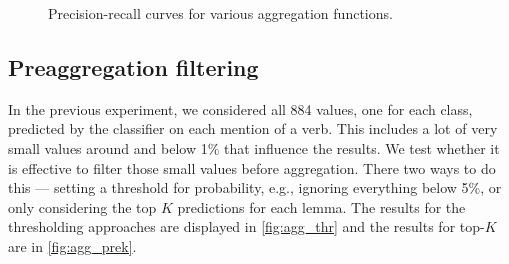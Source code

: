 \begin{figure}[h]
\centering

\begin{subfigure}[t]{0.5\textwidth}
\centering

\end{subfigure}%
%
\begin{subfigure}[t]{0.5\textwidth}
\centering

\end{subfigure}

\begin{subfigure}[t]{0.5\textwidth}
\centering

\end{subfigure}%
%
\begin{subfigure}[t]{0.5\textwidth}
\centering

\end{subfigure}

\caption{Precision-recall curves for various aggregation functions.}
\label{fig:agg_functions}
\end{figure}

\subsection{Preaggregation filtering}

In the previous experiment, we considered all 884 values, one for each class, predicted by the classifier on each mention of a verb. This includes a lot of very small values around and below 1\% that influence the results. We test whether it is effective to filter those small values before aggregation. There two ways to do this --- setting a threshold for probability, e.g., ignoring everything below 5\%, or only considering the top $K$ predictions for each lemma. The results for the thresholding approaches are displayed in \cref{fig:agg_thr} and the results for top-$K$ are in \cref{fig:agg_prek}.

